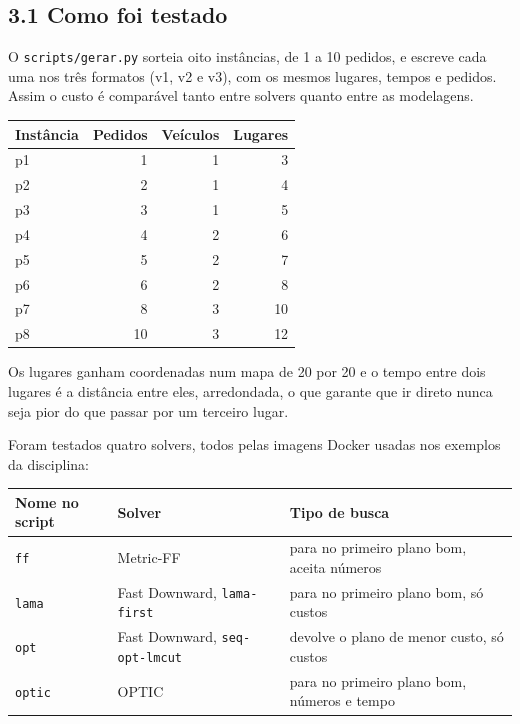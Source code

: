 \documentclass[11pt,a4paper]{article}
\newcommand{\cod}[1]{\texttt{#1}}
\begin{document}
\subsection*{3.1 Como foi testado}

O \cod{scripts/gerar.py} sorteia oito instâncias, de 1 a 10 pedidos, e escreve cada uma nos três formatos (v1, v2 e v3), com os mesmos lugares, tempos e pedidos. Assim o custo é comparável tanto entre solvers quanto entre as modelagens.

\begin{center}
\begin{tabular}{lrrr}
\toprule
Instância & Pedidos & Veículos & Lugares \\
\midrule
p1 & 1 & 1 & 3 \\
p2 & 2 & 1 & 4 \\
p3 & 3 & 1 & 5 \\
p4 & 4 & 2 & 6 \\
p5 & 5 & 2 & 7 \\
p6 & 6 & 2 & 8 \\
p7 & 8 & 3 & 10 \\
p8 & 10 & 3 & 12 \\
\bottomrule
\end{tabular}
\end{center}

Os lugares ganham coordenadas num mapa de 20 por 20 e o tempo entre dois lugares é a distância entre eles, arredondada, o que garante que ir direto nunca seja pior do que passar por um terceiro lugar.

Foram testados quatro solvers, todos pelas imagens Docker usadas nos exemplos da disciplina:

\begin{center}
\begin{tabular}{ll>{\raggedright\arraybackslash}p{6cm}}
\toprule
Nome no script & Solver & Tipo de busca \\
\midrule
\cod{ff}    & Metric-FF                            & para no primeiro plano bom, aceita números \\
\cod{lama}  & Fast Downward, \cod{lama-first}      & para no primeiro plano bom, só custos \\
\cod{opt}   & Fast Downward, \cod{seq-opt-lmcut}   & devolve o plano de menor custo, só custos \\
\cod{optic} & OPTIC                                & para no primeiro plano bom, números e tempo \\
\bottomrule
\end{tabular}
\end{center}
\end{document}
